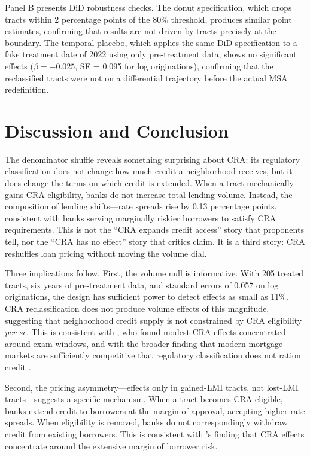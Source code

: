 \documentclass[12pt]{article}
\begin{document}
Panel B presents DiD robustness checks. The donut specification, which drops tracts within 2 percentage points of the 80\% threshold, produces similar point estimates, confirming that results are not driven by tracts precisely at the boundary. The temporal placebo, which applies the same DiD specification to a fake treatment date of 2022 using only pre-treatment data, shows no significant effects ($\beta = -0.025$, SE = 0.095 for log originations), confirming that the reclassified tracts were not on a differential trajectory before the actual MSA redefinition.

\section{Discussion and Conclusion}

The denominator shuffle reveals something surprising about CRA: its regulatory classification does not change how much credit a neighborhood receives, but it does change the terms on which credit is extended. When a tract mechanically gains CRA eligibility, banks do not increase total lending volume. Instead, the composition of lending shifts---rate spreads rise by 0.13 percentage points, consistent with banks serving marginally riskier borrowers to satisfy CRA requirements. This is not the ``CRA expands credit access'' story that proponents tell, nor the ``CRA has no effect'' story that critics claim. It is a third story: CRA reshuffles loan pricing without moving the volume dial.

Three implications follow. First, the volume null is informative. With 205 treated tracts, six years of pre-treatment data, and standard errors of 0.057 on log originations, the design has sufficient power to detect effects as small as 11\%. CRA reclassification does not produce volume effects of this magnitude, suggesting that neighborhood credit supply is not constrained by CRA eligibility \textit{per se}. This is consistent with \citet{bhutta2011community}, who found modest CRA effects concentrated around exam windows, and with the broader finding that modern mortgage markets are sufficiently competitive that regulatory classification does not ration credit \citep{berger2005does}.

Second, the pricing asymmetry---effects only in gained-LMI tracts, not lost-LMI tracts---suggests a specific mechanism. When a tract becomes CRA-eligible, banks extend credit to borrowers at the margin of approval, accepting higher rate spreads. When eligibility is removed, banks do not correspondingly withdraw credit from existing borrowers. This is consistent with \citet{agarwal2012did}'s finding that CRA effects concentrate around the extensive margin of borrower risk.
\end{document}
